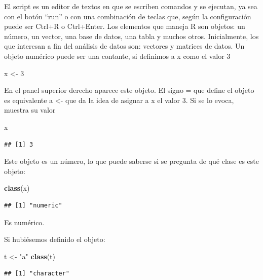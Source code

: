 \documentclass[]{book}
\newenvironment{Shaded}{\begin{snugshade}}{\end{snugshade}}
\newcommand{\DecValTok}[1]{\textcolor[rgb]{0.00,0.00,0.81}{#1}}
\newcommand{\KeywordTok}[1]{\textcolor[rgb]{0.13,0.29,0.53}{\textbf{#1}}}
\newcommand{\NormalTok}[1]{#1}
\newcommand{\StringTok}[1]{\textcolor[rgb]{0.31,0.60,0.02}{#1}}
\begin{document}
El script es un editor de textos en que se escriben comandos y se ejecutan, ya sea con el botón ``run'' o con una combinación de teclas que, según la configuración puede ser Ctrl+R o Ctrl+Enter. Los elementos que maneja R son objetos: un número, un vector, una base de datos, una tabla y muchos otros. Inicialmente, los que interesan a fin del análisis de datos son: vectores y matrices de datos.
Un objeto numérico puede ser una contante, si definimos a x como el valor 3

\begin{Shaded}
\begin{Highlighting}[]
\NormalTok{x <-}\StringTok{ }\DecValTok{3}
\end{Highlighting}
\end{Shaded}

En el panel superior derecho aparece este objeto. El signo = que define el objeto es equivalente a \textless{}- que da la idea de asignar a x el valor 3.
Si se lo evoca, muestra su valor

\begin{Shaded}
\begin{Highlighting}[]
\NormalTok{x}
\end{Highlighting}
\end{Shaded}

\begin{verbatim}
## [1] 3
\end{verbatim}

Este objeto es un número, lo que puede saberse si se pregunta de qué clase es este objeto:

\begin{Shaded}
\begin{Highlighting}[]
\KeywordTok{class}\NormalTok{(x)}
\end{Highlighting}
\end{Shaded}

\begin{verbatim}
## [1] "numeric"
\end{verbatim}

Es numérico.

Si hubiésemos definido el objeto:

\begin{Shaded}
\begin{Highlighting}[]
\NormalTok{t <-}\StringTok{ "a"}
\KeywordTok{class}\NormalTok{(t)}
\end{Highlighting}
\end{Shaded}

\begin{verbatim}
## [1] "character"
\end{verbatim}
\end{document}
